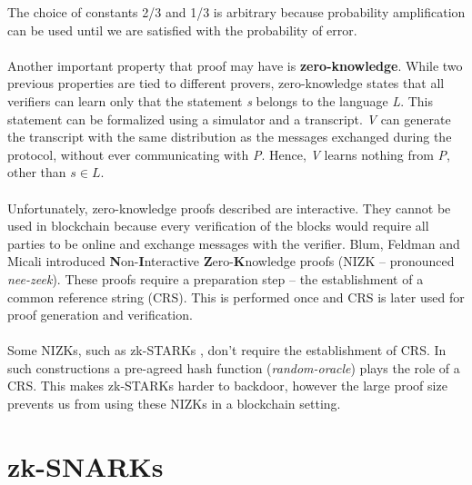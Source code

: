 \noindent The choice of constants 2/3 and 1/3 is arbitrary because probability amplification can be used until we are satisfied with the probability of error.\\
\\
Another important property that proof may have is \textbf{zero-knowledge}. While two previous properties are tied to different provers, zero-knowledge states that all verifiers can learn only that the statement \textit{s} belongs to the language \textit{L}. This statement can be formalized using a simulator and a transcript. \textit{V} can generate the transcript with the same distribution as the messages exchanged during the protocol, without ever communicating with \textit{P}. Hence, \textit{V} learns nothing from \textit{P}, other than $s \in L$.\\
\\
Unfortunately, zero-knowledge proofs described are interactive. They cannot be used in blockchain because every verification of the blocks would require all parties to be online and exchange messages with the verifier. Blum, Feldman and Micali \cite{blum1988non} introduced \textbf{N}on-\textbf{I}nteractive \textbf{Z}ero-\textbf{K}nowledge proofs (NIZK -- pronounced \textit{nee-zeek}). These proofs require a preparation step -- the establishment of a common reference string (CRS). This is performed once and CRS is later used for proof generation and verification.\\
\\
Some NIZKs, such as zk-STARKs \cite{ben2018scalable}, don't require the establishment of CRS. In such constructions a pre-agreed hash function (\textit{random-oracle}) plays the role of a CRS. This makes zk-STARKs harder to backdoor, however the large proof size prevents us from using these NIZKs in a blockchain setting.

\section{zk-SNARKs}

